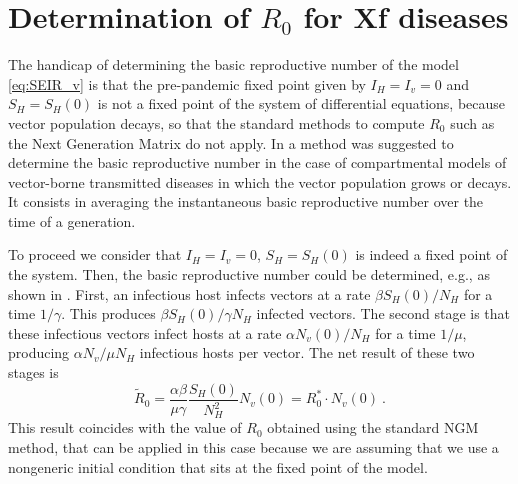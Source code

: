 


\section{Determination of $R_0$ for Xf diseases}\label{app:R0}

The handicap of determining the basic reproductive number of the model
\cref{eq:SEIR_v} is that the pre-pandemic fixed point given by $I_H=I_v=0$ and
$S_H=S_H(0)$ is not a fixed point of the system of differential equations,
because vector population decays, so that the standard methods to compute $R_0$
such as the Next Generation Matrix \cite{Diekmann2010, GimenezRomero2022_PRE}
do not
apply. In \cite{GimenezRomero2022_PRE} a method was suggested to determine
the basic
reproductive number in the case of compartmental models of vector-borne
transmitted diseases in which the vector population grows or decays. It
consists in averaging the instantaneous basic reproductive number over the time
of a generation.

To proceed we consider that $I_H=I_v=0$, $S_H=S_H(0)$ is indeed a fixed
point of the system. Then, the basic reproductive number could be determined,
e.g., as shown in \cite{Brauer2016}. First, an infectious host infects vectors
at a rate $\beta S_H(0)/N_H$ for a time $1/\gamma$. This produces $\beta
    S_H(0)/\gamma N_H$ infected vectors. The second stage is that these
infectious
vectors infect hosts at a rate $\alpha N_v(0)/N_H$ for a time $1/\mu$,
producing $\alpha N_v/\mu N_H$ infectious hosts per vector. The net result of
these two stages is
\begin{equation}
    \tilde{R}_0=\frac{\alpha\beta}{\mu\gamma}
    \frac{S_H(0)}{N_H^2}N_v(0)=R_0^*
    \cdot
    N_v(0)\ .
    \label{eq:R0tilde}
\end{equation}
This result coincides with the value of $R_0$ obtained using the standard
NGM method, that can be applied in this case because we are assuming that we
use a nongeneric initial condition that sits at the fixed point of the model.

